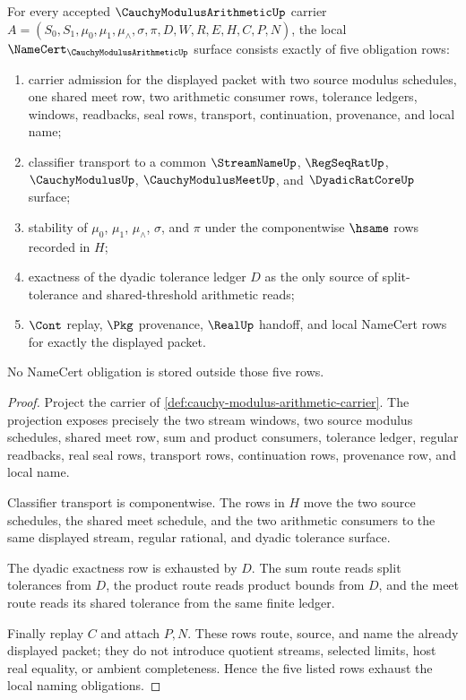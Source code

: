 \begin{theorem}
\label{thm:cauchy-modulus-arithmetic-namecert-obligations}
For every accepted $\CauchyModulusArithmeticUp$ carrier
$A=(S_0,S_1,\mu_0,\mu_1,\mu_{\wedge},\sigma,\pi,D,W,R,E,H,C,P,N)$, the local
$\NameCert_{\CauchyModulusArithmeticUp}$ surface consists exactly of five
obligation rows:
\begin{enumerate}
\item carrier admission for the displayed packet with two source modulus
schedules, one shared meet row, two arithmetic consumer rows, tolerance
ledgers, windows, readbacks, seal rows, transport, continuation, provenance,
and local name;
\item classifier transport to a common $\StreamNameUp$, $\RegSeqRatUp$,
$\CauchyModulusUp$, $\CauchyModulusMeetUp$, and $\DyadicRatCoreUp$ surface;
\item stability of $\mu_0$, $\mu_1$, $\mu_{\wedge}$, $\sigma$, and $\pi$
under the componentwise $\hsame$ rows recorded in $H$;
\item exactness of the dyadic tolerance ledger $D$ as the only source of
split-tolerance and shared-threshold arithmetic reads;
\item $\Cont$ replay, $\Pkg$ provenance, $\RealUp$ handoff, and local
NameCert rows for exactly the displayed packet.
\end{enumerate}
No NameCert obligation is stored outside those five rows.
\end{theorem}
\begin{proof}
Project the carrier of \autoref{def:cauchy-modulus-arithmetic-carrier}. The
projection exposes precisely the two stream windows, two source modulus
schedules, shared meet row, sum and product consumers, tolerance ledger,
regular readbacks, real seal rows, transport rows, continuation rows,
provenance row, and local name.

Classifier transport is componentwise. The rows in $H$ move the two source
schedules, the shared meet schedule, and the two arithmetic consumers to the
same displayed stream, regular rational, and dyadic tolerance surface.

The dyadic exactness row is exhausted by $D$. The sum route reads split
tolerances from $D$, the product route reads product bounds from $D$, and the
meet route reads its shared tolerance from the same finite ledger.

Finally replay $C$ and attach $P,N$. These rows route, source, and name the
already displayed packet; they do not introduce quotient streams, selected
limits, host real equality, or ambient completeness. Hence the five listed
rows exhaust the local naming obligations.
\end{proof}

